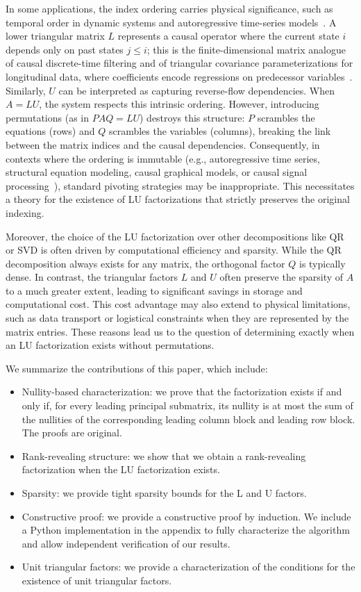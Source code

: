 \documentclass[final]{siamart1116}
\numberwithin{theorem}{section}
\begin{document}
In some applications, the index ordering carries physical significance, such as temporal order in dynamic systems and autoregressive time-series models~\cite{hamilton_time_1994,granger_investigating_1969}. A lower triangular matrix $L$ represents a causal operator where the current state $i$ depends only on past states $j \le i$; this is the finite-dimensional matrix analogue of causal discrete-time filtering and of triangular covariance parameterizations for longitudinal data, where coefficients encode regressions on predecessor variables~\cite{oppenheim_discrete_2010,pourahmadi_joint_1999}. Similarly, $U$ can be interpreted as capturing reverse-flow dependencies. When $A=LU$, the system respects this intrinsic ordering. However, introducing permutations (as in $PAQ = LU$) destroys this structure: $P$ scrambles the equations (rows) and $Q$ scrambles the variables (columns), breaking the link between the matrix indices and the causal dependencies. Consequently, in contexts where the ordering is immutable (e.g., autoregressive time series, structural equation modeling, causal graphical models, or causal signal processing~\cite{bollen_structural_1989,pearl_causality_2009,peters_elements_2017}), standard pivoting strategies may be inappropriate. This necessitates a theory for the existence of LU factorizations that strictly preserves the original indexing.

Moreover, the choice of the LU factorization over other decompositions like QR or SVD is often driven by computational efficiency and sparsity. While the QR decomposition always exists for any matrix, the orthogonal factor $Q$ is typically dense. In contrast, the triangular factors $L$ and $U$ often preserve the sparsity of $A$ to a much greater extent, leading to significant savings in storage and computational cost. This cost advantage may also extend to physical limitations, such as data transport or logistical constraints when they are represented by the matrix entries. These reasons lead us to the question of determining exactly when an LU factorization exists without permutations.

We summarize the contributions of this paper, which include:
\begin{itemize}
  \item Nullity-based characterization: we prove that the factorization exists if and only if, for every leading principal submatrix, its nullity is at most the sum of the nullities of the corresponding leading column block and leading row block. The proofs are original.
  \item Rank-revealing structure: we show that we obtain a rank-revealing factorization when the LU factorization exists.
  \item Sparsity: we provide tight sparsity bounds for the L and U factors.
  \item Constructive proof: we provide a constructive proof by induction. We include a Python implementation in the appendix to fully characterize the algorithm and allow independent verification of our results.
  \item Unit triangular factors: we provide a characterization of the conditions for the existence of unit triangular factors.
\end{itemize}
\end{document}
